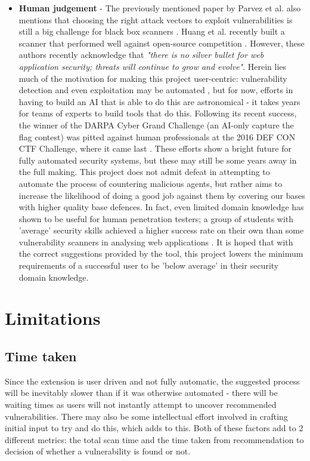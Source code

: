 \begin{itemize}
	
	\item \textbf{Human judgement} - The previously mentioned paper by Parvez et al. also mentions that choosing the right attack vectors to exploit vulnerabilities is still a big challenge for black box scanners \cite{analysisOfEffectivenessOfBlackBoxWebAppScannersStoredSQLStoredXSS}. Huang et al. recently built a scanner that performed well against open-source competition \cite{webAppSecThreatsCountermeasuresPitfalls}. However, these authors recently acknowledge that \emph{"there is no silver bullet for web application security; threats will continue to grow and evolve"}. Herein lies much of the motivation for making this project user-centric: vulnerability detection and even exploitation may be automated \cite{darpaAIChallenge}, but for now, efforts in having to build an AI that is able to do this are astronomical - it takes years for teams of experts to build tools that do this. Following its recent success, the winner of the DARPA Cyber Grand Challenge (an AI-only capture the flag contest) was pitted against human professionals at the 2016 DEF CON CTF Challenge, where it came last \cite{defcon16Results}. These efforts show a bright future for fully automated security systems, but these may still be some years away in the full making. This project does not admit defeat in attempting to automate the process of countering malicious agents, but rather aims to increase the likelihood of doing a good job against them by covering our bases with higher quality base defences. In fact, even limited domain knowledge has shown to be useful for human penetration testers; a group of students with 'average' security skills achieved a higher success rate on their own than some vulnerability scanners in analysing web applications \cite{whyJohnnyCantPentest}. It is hoped that with the correct suggestions provided by the tool, this project lowers the minimum requirements of a successful user to be 'below average' in their security domain knowledge. \\

\end{itemize}


 
\section{Limitations}
\subsection{Time taken}
Since the extension is user driven and not fully automatic, the suggested process will be inevitably slower than if it was otherwise automated - there will be waiting times as users will not instantly attempt to uncover recommended vulnerabilities. There may also be some intellectual effort involved in crafting initial input to try and do this, which adds to this. Both of these factors add to 2 different metrics: the total scan time and the time taken from recommendation to decision of whether a vulnerability is found or not. \\

